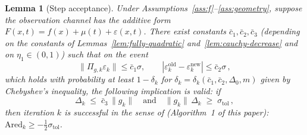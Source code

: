 \documentclass[11pt,a4paper]{article}
\newtheorem{lemma}[theorem]{Lemma}
\begin{document}
\begin{lemma}[Step acceptance]
\label{lem:step-accept}
Under Assumptions~\ref{ass:f}--\ref{ass:geometry}, suppose the
observation channel has the additive form
$F(x,t)=f(x)+\mu(t)+\varepsilon(x,t)$. There exist constants
$\bar c_1,\bar c_2,\bar c_3$ (depending on the constants of
Lemmas~\ref{lem:fully-quadratic} and~\ref{lem:cauchy-decrease}
and on $\eta_1\in(0,1)$) such that on the event
\begin{equation}\label{eq:noise-event}
  \|\Pi_{g,k}\varepsilon_k\|\le\bar c_1\sigma,\qquad
  |\varepsilon_k^{\mathrm{old}}-\varepsilon_k^{\mathrm{new}}|\le\bar c_2\sigma\,,
\end{equation}
which holds with probability at least $1-\delta_k$ for
$\delta_k=\delta_k(\bar c_1,\bar c_2,\Delta_0,m)$ given by
Chebyshev's inequality, the following implication is valid: if
\begin{equation}\label{eq:accept-hypothesis}
  \Delta_k\;\le\;\bar c_3\,\|g_k\|
  \quad\text{and}\quad
  \|g_k\|\,\Delta_k\;\ge\;\sigma_{\mathrm{tol}}\,,
\end{equation}
then iteration $k$ is successful in the sense of
\cite[Algorithm~6.1]{} (Algorithm~1 of this paper):
$\mathrm{Ared}_k\ge-\tfrac{1}{2}\sigma_{\mathrm{tol}}$.
\end{lemma}
\end{document}
